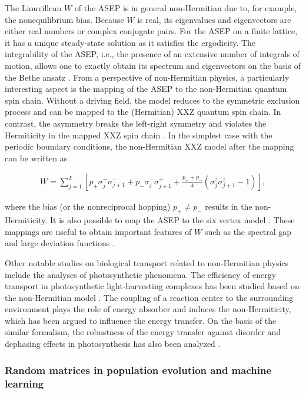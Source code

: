 \documentclass{tADP2e}
\theoremstyle{plain}
\newcommand{\eqn}[1]{
\begin{eqnarray}
	#1
\end{eqnarray}
}
\theoremstyle{plain}
\theoremstyle{definition}
\begin{document}
The Liouvillean $W$ of the ASEP is in general non-Hermitian due to, for example, the nonequilibrium bias. Because $W$ is real, its eigenvalues and eigenvectors are either real numbers or complex conjugate pairs. For the ASEP on a finite lattice, it has a unique steady-state solution as it satisfies the ergodicity. The integrability of the ASEP, i.e., the presence of an extensive number of integrals of motion, allows one to exactly obtain its spectrum and eigenvectors on the basis of the Bethe ansatz \cite{DD87,GLH92,KD95,ST99}. From a perspective of non-Hermitian physics, a particularly interesting aspect is the mapping of the ASEP to the non-Hermitian quantum spin chain. Without a driving field, the model reduces to the symmetric exclusion process and can be mapped to the (Hermitian) XXZ quantum spin chain. In contrast, the asymmetry breaks the left-right symmetry and violates the Hermiticity in the mapped XXZ spin chain \cite{DD87,GLH92,KD95,dG05}. In the simplest case with the periodic boundary conditions, the non-Hermitian XXZ model after the mapping can be written as
\eqn{
W=\sum_{j=1}^L\left[p_+\sigma_{j}^{+}\sigma_{j+1}^{-}+p_-\sigma_{j}^{-}\sigma_{j+1}^{+}+\frac{p_++p_-}{4}(\sigma_{j}^{z}\sigma_{j+1}^z-1)\right],
}
where the bias (or the nonreciprocal hopping) $p_+\neq p_-$ results in the non-Hermiticity.
It is also possible to map the ASEP to the six vertex model \cite{Kandel_1990,BR08}. These mappings are useful to obtain important  features of $W$ such as the spectral gap \cite{GLH92,KD95} and large deviation functions \cite{DB98,Derrida_1999}.

Other notable studies on biological transport related to non-Hermitian physics include the analyses of photosynthetic phenomena. The efficiency of energy transport in photosynthetic light-harvesting complexes has been studied based on the non-Hermitian model \cite{CG12}. The coupling of a reaction center to the surrounding environment plays the role of energy absorber and induces the non-Hermiticity, which has been argued to influence the energy transfer. On the basis of the similar formalism, the robustness of the energy transfer against disorder and dephasing effects in photosynthesis has also been analyzed \cite{CG14}. 


\subsubsection{Random matrices in population evolution and machine learning\label{secbiopop}}
\end{document}
